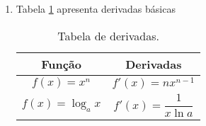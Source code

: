 \documentclass[a4paper, 12pt]{article}
\begin{document}
\begin{enumerate}
	\item Tabela \ref{tab-derivadas} apresenta derivadas básicas
	

	\begin{table}[!htb]
		\centering %
		\begin{tabular}{|c|c|} %
			\hline
			Função & Derivadas \\ \hline
			$f(x) = x^{n}$ & $f'(x) = nx^{n-1}$ \\ \hline
			$f(x) = \log_a x$ & $f'(x) = \dfrac{1}{x\ln a}$ \\ \hline
		\end{tabular}
		\caption{Tabela de derivadas.}
		\label{tab-derivadas}
	\end{table}
\end{enumerate}
\end{document}
